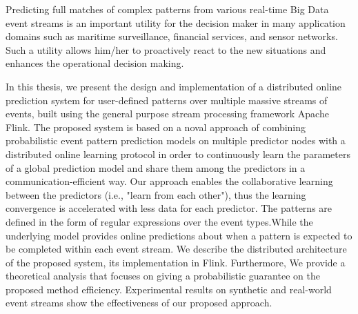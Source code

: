 Predicting full matches of complex patterns from various real-time Big Data event streams is an important utility for the decision maker in many application domains such as maritime surveillance, financial services, and sensor networks. Such a utility allows him/her to proactively react to the new situations and enhances the operational decision making.

\par In this thesis, we present the design and implementation of a distributed online prediction system for user-defined patterns over multiple massive streams of events, built using the general purpose stream processing framework Apache Flink. The proposed system is based on a noval approach of combining probabilistic event pattern prediction models on multiple predictor nodes with a distributed online learning protocol in order to continuously learn the parameters of a global prediction model and share them among the predictors in a communication-efficient way. Our approach enables the  collaborative learning between the predictors (i.e., "learn from each other"), thus the learning convergence is accelerated with less data for each predictor. The patterns are defined in the form of regular expressions over the event types.While the underlying model provides online predictions about when a pattern is expected to be completed within each event stream. We describe the distributed architecture of the proposed system, its implementation in Flink.  Furthermore, We provide a theoretical analysis that focuses on giving a probabilistic guarantee on the proposed method efficiency.  Experimental results on synthetic and real-world event streams show the effectiveness of our proposed approach.

